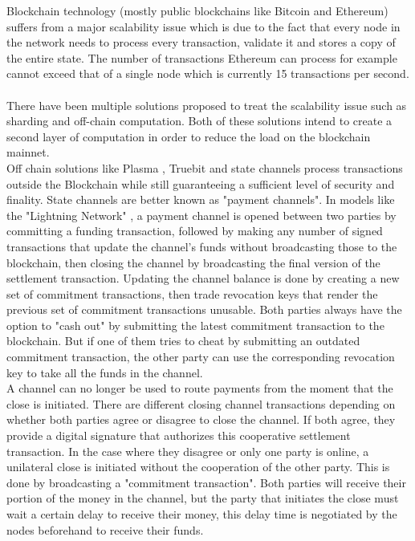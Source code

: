 Blockchain technology (mostly public blockchains like Bitcoin and Ethereum) suffers from a major scalability issue which is due to the fact that every node in the network needs to process every transaction, validate it and stores a copy of the entire state. The number of transactions Ethereum can process for example cannot exceed that of a single node which is currently 15 transactions per second.
\\~\\There have been multiple solutions proposed to treat the scalability issue such as sharding and off-chain computation. Both of these solutions intend to create a second layer of computation in order to reduce the load on the blockchain mainnet.
\\Off chain solutions like Plasma \cite{plasma}, Truebit \cite{truebit} and state channels process transactions outside the Blockchain while still guaranteeing a sufficient level of security and finality. State channels are better known as "payment channels". In models like the "Lightning Network" \cite{lightningnetwork}, a payment channel is opened between two parties by committing a funding transaction, followed by making any number of signed transactions that update the channel's funds without broadcasting those to the blockchain, then closing the channel by broadcasting the final version of the settlement transaction.
Updating the channel balance is done by creating a new set of commitment transactions, then trade revocation keys that render the previous set of commitment transactions unusable. Both parties always have the option to "cash out" by submitting the latest commitment transaction to the blockchain. But if one of them tries to cheat by submitting an outdated commitment transaction, the other party can use the corresponding revocation key to take all the funds in the channel.
\\A channel can no longer be used to route payments from the moment that the close is initiated. There are different closing channel transactions depending on whether both parties agree or disagree to close the channel. If both agree, they provide a digital signature that authorizes this cooperative settlement transaction. In the case where they disagree or only one party is online, a unilateral close is initiated without the cooperation of the other party. This is done by broadcasting a "commitment transaction". Both parties will receive their portion of the money in the channel, but the party that initiates the close must wait a certain delay to receive their money, this delay time is negotiated by the nodes beforehand to receive their funds.

